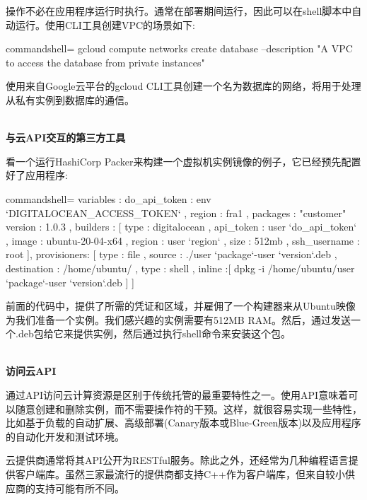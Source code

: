 操作不必在应用程序运行时执行。通常在部署期间运行，因此可以在shell脚本中自动运行。使用CLI工具创建VPC的场景如下:

\begin{tcblisting}{commandshell={}}
gcloud compute networks create database --description "A VPC to access the database from private instances"
\end{tcblisting}

使用来自Google云平台的gcloud CLI工具创建一个名为数据库的网络，将用于处理从私有实例到数据库的通信。

\hspace*{\fill} \\ %
\noindent
\textbf{与云API交互的第三方工具}

看一个运行HashiCorp Packer来构建一个虚拟机实例镜像的例子，它已经预先配置好了应用程序:

\begin{tcblisting}{commandshell={}}
{
  variables : {
    do_api_token : {{env `DIGITALOCEAN_ACCESS_TOKEN`}} ,
    region : fra1 ,
    packages : "customer"
    version : 1.0.3
  },
  builders : [
    {
      type : digitalocean ,
      api_token : {{user `do_api_token`}} ,
      image : ubuntu-20-04-x64 ,
      region : {{user `region`}} ,
      size : 512mb ,
      ssh_username : root
    }
  ],
  provisioners: [
    {
      type : file ,
      source : ./{{user `package`}}-{{user `version`}}.deb ,
      destination : /home/ubuntu/
    },
    {
      type : shell ,
      inline :[
        dpkg -i /home/ubuntu/{{user `package`}}-{{user `version`}}.deb
      ]
    }
  ]
}
\end{tcblisting}

前面的代码中，提供了所需的凭证和区域，并雇佣了一个构建器来从Ubuntu映像为我们准备一个实例。我们感兴趣的实例需要有512MB RAM。然后，通过发送一个.deb包给它来提供实例，然后通过执行shell命令来安装这个包。

\hspace*{\fill} \\ %
\noindent
\textbf{访问云API}

通过API访问云计算资源是区别于传统托管的最重要特性之一。使用API意味着可以随意创建和删除实例，而不需要操作符的干预。这样，就很容易实现一些特性，比如基于负载的自动扩展、高级部署(Canary版本或Blue-Green版本)以及应用程序的自动化开发和测试环境。

云提供商通常将其API公开为RESTful服务。除此之外，还经常为几种编程语言提供客户端库。虽然三家最流行的提供商都支持C++作为客户端库，但来自较小供应商的支持可能有所不同。

